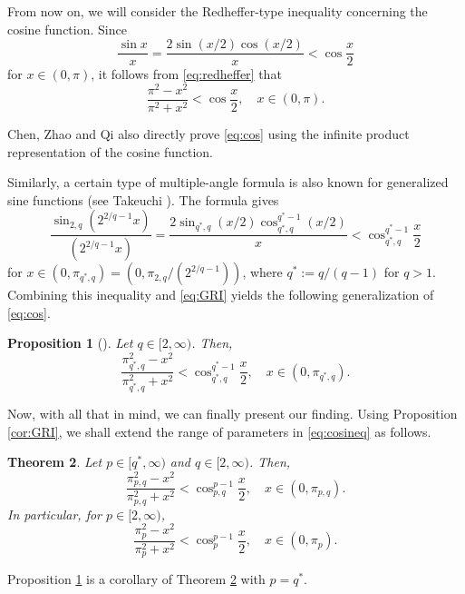 \documentclass[12pt]{amsart}
\numberwithin{equation}{section}
\theoremstyle{plain}
\newtheorem{thm}{Theorem}[section]
\newtheorem{lem}[thm]{Lemma}
\newtheorem{prop}[thm]{Proposition}
\theoremstyle{definition}
\theoremstyle{remark}
\begin{document}
From now on, we will consider the Redheffer-type inequality concerning the cosine function.
Since 
\[\frac{\sin{x}}{x}=\frac{2\sin{(x/2)}\cos{(x/2)}}{x}<\cos{\frac{x}{2}}\]
for $x \in (0,\pi)$,
it follows from \eqref{eq:redheffer} that 
\begin{equation}
\label{eq:cos}
\frac{\pi^2-x^2}{\pi^2+x^2} <\cos{\frac{x}{2}}, \quad x \in (0,\pi).
\end{equation}

Chen, Zhao and Qi \cite{CZQ2004} also directly prove \eqref{eq:cos} 
using the infinite product representation of the cosine function.

Similarly, a certain type of multiple-angle formula is also known for 
generalized sine functions
 (see Takeuchi \cite{T2016}). 
The formula gives
\[\frac{\sin_{2,q}{(2^{2/q-1}x)}}{(2^{2/q-1}x)}
=\frac{2\sin_{q^*,q}{(x/2)}\cos_{q^*,q}^{q^*-1}{(x/2)}}{x}
<\cos_{q^*,q}^{q^*-1}{\frac{x}{2}}\]
for $x \in (0,\pi_{q^*,q})=(0,\pi_{2,q}/(2^{2/q-1}))$,
where $q^*:=q/(q-1)$ for $q>1$.
Combining this inequality
and \eqref{eq:GRI}
yields the following generalization of \eqref{eq:cos}.

\begin{prop}[\cite{OT2021}]
\label{thm:cos}
Let $q \in [2,\infty)$. Then,
\begin{equation}
\label{eq:cosineq}
\frac{\pi_{q^*,q}^2-x^2}{\pi_{q^*,q}^2+x^2}<\cos_{q^*,q}^{q^*-1}{\frac{x}{2}}, 
\quad x \in (0,\pi_{q^*,q}).
\end{equation}
\end{prop}


Now, with all that in mind, we can finally present our finding.
Using Proposition \ref{cor:GRI}, we shall extend
the range of parameters in \eqref{eq:cosineq} as follows.

\begin{thm}
\label{thm:cosredheffer}
Let $p \in [q^*,\infty)$ and $q \in [2,\infty)$. Then,
\[\frac{\pi_{p,q}^2-x^2}{\pi_{p,q}^2+x^2}<\cos_{p,q}^{p-1}{\frac{x}{2}}, \quad x \in (0,\pi_{p,q}).\]
In particular, for $p \in [2,\infty)$,
\[\frac{\pi_p^2-x^2}{\pi_p^2+x^2}<\cos_p^{p-1}{\frac{x}{2}}, \quad x \in (0,\pi_p).\]
\end{thm}

Proposition \ref{thm:cos} is a corollary
of Theorem \ref{thm:cosredheffer} with $p=q^*$.

\end{document}

